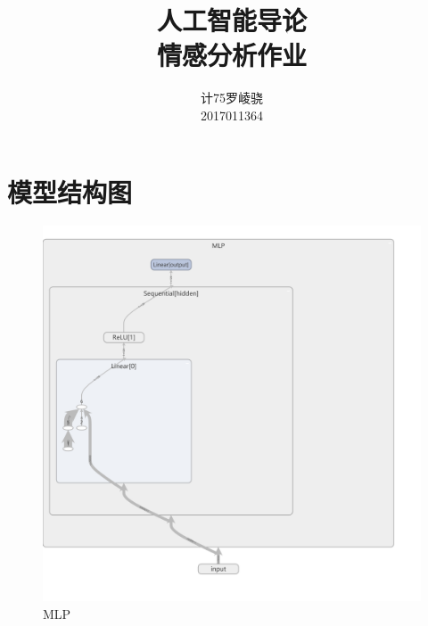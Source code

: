 \documentclass[a4paper]{article}
\title{人工智能导论\\情感分析作业}
\author{计75罗崚骁\\2017011364}
\date{}
\begin{document}
    \maketitle

    \section{模型结构图}

    \begin{figure}[H]
        \centering
        \includegraphics[width=\linewidth]{assets/mlp.png}
        \caption{MLP}
    \end{figure}
\end{document}
